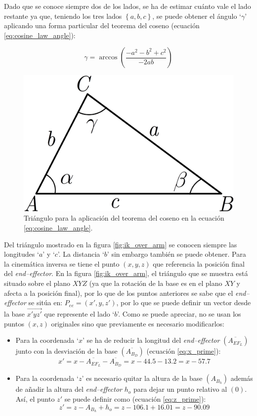 Dado que se conoce siempre dos de los lados, se ha de estimar cuánto vale el lado
restante ya que, teniendo los tres lados $\left\{a,b,c\right\}$, se puede obtener
el ángulo `$\gamma$' aplicando una forma particular del teorema del coseno
(ecuación \ref{eq:cosine_law_angle}):

\begin{equation}\label{eq:cosine_law_angle}
    \gamma = \arccos{\left(\frac{-a^2 - b^2 + c^2}{-2ab}\right)}
\end{equation}

\begin{figure}[H]
    \centering
    \includegraphics[width=.3\linewidth]{pictures/cosine_law.png}
    \caption{Triángulo para la aplicación del teorema del coseno en la ecuación \ref{eq:cosine_law_angle}.}
    \label{fig:cosine_law_triangle}
\end{figure}

Del triángulo mostrado en la figura \ref{fig:ik_over_arm} se conocen siempre las longitudes
`$a$' y `$c$'. La distancia `$b$' sin embargo también se puede obtener. Para la cinemática
inversa se tiene el punto $\left(x, y, z\right)$ que referencia la posición final del
\textit{end--effector}. En la figura \ref{fig:ik_over_arm}, el triángulo que se muestra
está situado sobre el plano $XYZ$ (ya que la rotación de la base es en el plano $XY$
y afecta a la posición final), por lo que de los puntos anteriores
se sabe que el \textit{end--effector} se sitúa en: $P_{ee} = \left(x', y, z'\right)$, 
por lo que se puede definir un vector desde la base $\overrightarrow{x'yz'}$ que 
represente el lado `$b$'. Como se puede apreciar, no se usan los puntos $\left(x, z\right)$ 
originales sino que previamente es necesario modificarlos:
\begin{itemize}
    \item Para la coordenada `$x$' se ha de reducir la longitud del \textit{end--effector}
    $\left(\overline{A_{EF_L}}\right)$ junto con la desviación de la base $\left(\overline{A_{B_D}}\right)$
    (ecuación \ref{eq:x_prime}):
    \begin{equation}\label{eq:x_prime}
        x' = x - \overline{A_{EF_L}} - \overline{A_{B_D}} = x - 44.5 - 13.2 = x - 57.7
    \end{equation}
    
    \item Para la coordenada `$z$' es necesario quitar la altura de la base $\left(A_{B_h}\right)$
    además de añadir la altura del \textit{end--effector} $h_o$ para dejar un punto 
    relativo al $\left(0\right)$. Así, el punto $z'$ se puede definir
    como (ecuación \ref{eq:z_prime}):
    \begin{equation}\label{eq:z_prime}
        z' = z - A_{B_h} + h_o = z - 106.1 + 16.01 = z - 90.09
    \end{equation}
\end{itemize}

